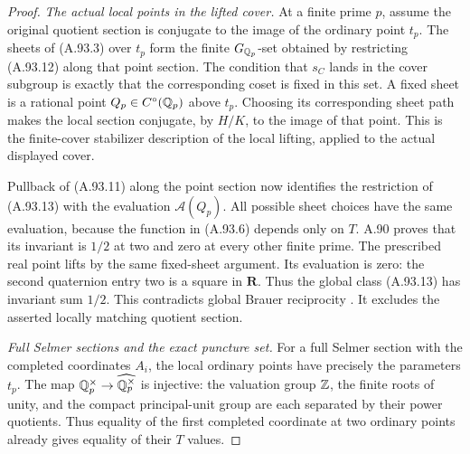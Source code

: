 \begin{proof}
\emph{The actual local points in the lifted cover.}
At a finite prime $p$, assume the original
quotient section is conjugate to the image
of the ordinary point $t_p$.
The sheets of (A.93.3) over $t_p$ form the
finite $G_{\mathbb Q_p}$-set obtained by restricting
(A.93.12) along that point section.
The condition that $s_C$ lands in the cover
subgroup is exactly that the corresponding
coset is fixed in this set.
A fixed sheet is a rational point
$Q_p\in C^\circ(\mathbb Q_p)$ above $t_p$.
Choosing its corresponding sheet path makes
the local section conjugate, by $H/K$, to
the image of that point.
This is the finite-cover stabilizer
description of the local lifting, applied
to the actual displayed cover.

Pullback of (A.93.11) along the point
section now identifies the restriction of
(A.93.13) with the evaluation
$\mathcal A(Q_p)$.
All possible sheet choices have the same
evaluation, because the function in
(A.93.6) depends only on $T$.
A.90 proves that its invariant is $1/2$
at two and zero at every other finite prime.
The prescribed real point lifts by the
same fixed-sheet argument.  Its evaluation
is zero: the second quaternion entry two
is a square in $\mathbf R$.
Thus the global
class (A.93.13) has invariant sum $1/2$.
This contradicts global Brauer reciprocity
\cite[Theorem 12.1.8]{AgentCTSkoro2019}.
It excludes the asserted locally matching
quotient section.

\emph{Full Selmer sections and the exact puncture set.}
For a full Selmer section with the completed
coordinates $A_i$, the local ordinary
points have precisely the parameters
$t_p$.
The map
$\mathbb Q_p^\times\to\widehat{\mathbb Q_p^\times}$
is injective: the valuation group
$\mathbb Z$, the finite roots of unity, and
the compact principal-unit group are
each separated by their power quotients.
Thus equality of the first completed
coordinate at two ordinary points
already gives equality of their
$T$ values.


\end{proof}
